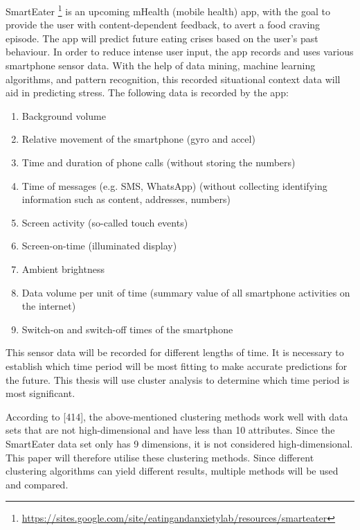 \documentclass[12pt,a4paper]{article}
\begin{document}


SmartEater \footnote{\url{https://sites.google.com/site/eatingandanxietylab/resources/smarteater}} is an upcoming mHealth (mobile health) app, with the goal to provide the user with content-dependent feedback, to avert a food craving episode. The app will predict future eating crises based on the user's past behaviour. In order to reduce intense user input, the app records and uses various smartphone sensor data.  With the help of data mining, machine learning algorithms, and pattern recognition, this recorded situational context data will aid in predicting stress. The following data is recorded by the app:

\begin{enumerate}
	\item Background volume
	\item Relative movement of the smartphone (gyro and accel)
	\item Time and duration of phone calls (without storing the numbers)
	\item Time of messages (e.g. SMS, WhatsApp) (without collecting identifying information such as content, addresses, numbers)
	\item Screen activity (so-called touch events)
	\item Screen-on-time (illuminated display)
	\item Ambient brightness
	\item Data volume per unit of time (summary value of all smartphone activities on the internet)
	\item Switch-on and switch-off times of the smartphone
\end{enumerate}


This sensor data will be recorded for different lengths of time. It is necessary to establish which time period will be most fitting to make accurate predictions for the future. This thesis will use cluster analysis to determine which time period is most significant.

According to \textcite{han2011data}[414], the above-mentioned clustering methods work well with data sets that are not high-dimensional and have less than 10 attributes. Since the SmartEater data set only has 9 dimensions, it is not considered high-dimensional. This paper will therefore utilise these clustering methods. Since different clustering algorithms can yield different results, multiple methods will be used and compared.
\end{document}
